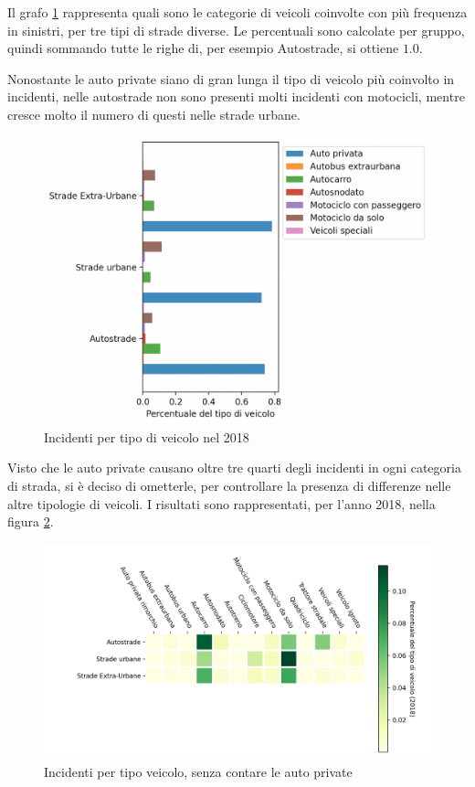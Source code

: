 \documentclass[a4paper]{report}
\begin{document}
Il grafo \ref{fig:differenza-strade} rappresenta quali sono le categorie di veicoli coinvolte 
con più frequenza in sinistri, per tre tipi di strade diverse. 
Le percentuali sono calcolate per gruppo, quindi sommando 
tutte le righe di, per esempio Autostrade, si ottiene $1.0$.

Nonostante le auto private siano di gran lunga il tipo di veicolo 
più coinvolto in incidenti, nelle autostrade non sono presenti molti incidenti con motocicli, 
mentre cresce molto il numero di questi nelle strade urbane.

\begin{figure}
    \includegraphics[width=\linewidth]{../src/incidenti/incidenti_senza_coords/tipo_veicoli/differenza_strade.png}
    \caption{Incidenti per tipo di veicolo nel 2018}
    \label{fig:differenza-strade}
\end{figure}

Visto che le auto private causano oltre tre quarti degli incidenti in ogni categoria di strada,  
si è deciso di ometterle, per controllare la presenza di differenze nelle altre tipologie 
di veicoli.
I risultati sono rappresentati, per l'anno 2018, nella figura \ref{fig:differenza-strade-no-auto}.

\begin{figure}
    \includegraphics[width=\linewidth]{../src/incidenti/incidenti_senza_coords/tipo_veicoli/differenza_senza_auto.png}
    \caption{Incidenti per tipo veicolo, senza contare le auto private}
    \label{fig:differenza-strade-no-auto}
\end{figure}
\end{document}
